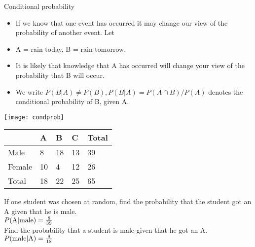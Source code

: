 \begin{frame}{ Conditional probability}

\begin{itemize}
\item  If we know that one event has occurred it may change our view of the 
probability of another event. Let  
\item  A = {rain today}, B = {rain tomorrow}.  
\item  It is likely that knowledge that A has occurred will change your view 
of the probability that B will occur. 
\item  We write $P(B|A) \neq P(B), P(B|A) = P(A \cap B)/P(A)$ denotes the 
conditional probability of B, given A.  
\end{itemize}
\begin{center}
\texttt{[image: condprob]}
\end{center}

\end{frame}
\begin{frame}

\begin{center}
\begin{tabular}{|l|l|l|l|l|}
\hline
&	A	&B	&C&	Total\\
\hline
Male&	8&	18&	13&	39\\
\hline
Female&	10	&4	&12&	26\\
\hline
Total&	18&	22&	25&	65\\
\hline
\end{tabular}
\end{center}
If one student was chosen at random, find the probability that the student got an A given that he is male.\\

\vspace{.1in}
$P(\hbox{A}|\hbox{male})=  \frac{8}{39}$  \\
\vspace{.1in}
Find the probability that a student is male given that he got an A.\\
\vspace{.1in} 
$P(\hbox{male}|\hbox{A}) =  \frac{8}{18}$ 
\end{frame}

